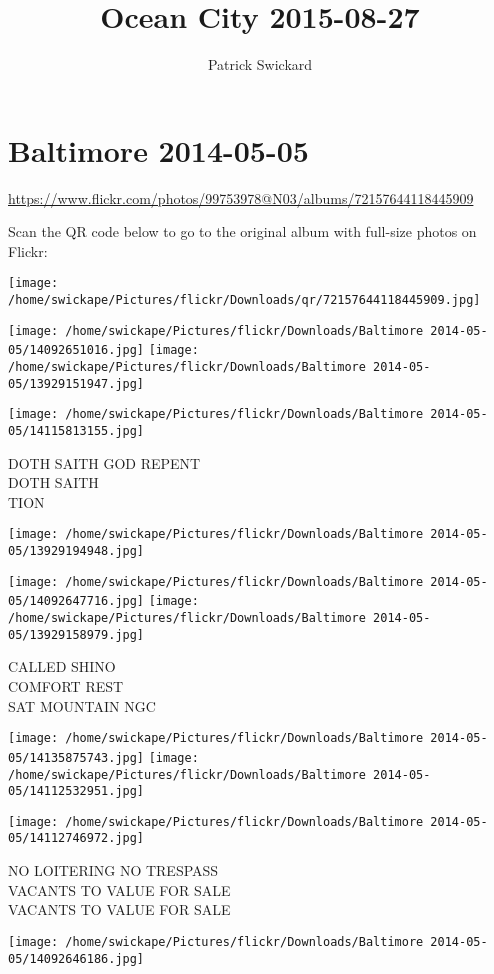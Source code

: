\documentclass[10pt,letterpaper]{article}
\title{Ocean City 2015-08-27}
\author{Patrick Swickard}
\date{}
\begin{document}
\section*{Baltimore 2014-05-05}

\url{https://www.flickr.com/photos/99753978@N03/albums/72157644118445909}

Scan the QR code below to go to the original album with full-size photos on Flickr:

\texttt{[image: /home/swickape/Pictures/flickr/Downloads/qr/72157644118445909.jpg]}
\pagebreak

\texttt{[image: /home/swickape/Pictures/flickr/Downloads/Baltimore 2014-05-05/14092651016.jpg]}
\texttt{[image: /home/swickape/Pictures/flickr/Downloads/Baltimore 2014-05-05/13929151947.jpg]}

\texttt{[image: /home/swickape/Pictures/flickr/Downloads/Baltimore 2014-05-05/14115813155.jpg]}

DOTH SAITH GOD REPENT\\
DOTH SAITH\\
TION
\pagebreak

\texttt{[image: /home/swickape/Pictures/flickr/Downloads/Baltimore 2014-05-05/13929194948.jpg]}

\vspace{0.25in}
\texttt{[image: /home/swickape/Pictures/flickr/Downloads/Baltimore 2014-05-05/14092647716.jpg]}
\texttt{[image: /home/swickape/Pictures/flickr/Downloads/Baltimore 2014-05-05/13929158979.jpg]}

CALLED SHINO\\
COMFORT REST\\
SAT MOUNTAIN NGC
\pagebreak

\texttt{[image: /home/swickape/Pictures/flickr/Downloads/Baltimore 2014-05-05/14135875743.jpg]}
\texttt{[image: /home/swickape/Pictures/flickr/Downloads/Baltimore 2014-05-05/14112532951.jpg]}

\texttt{[image: /home/swickape/Pictures/flickr/Downloads/Baltimore 2014-05-05/14112746972.jpg]}

NO LOITERING NO TRESPASS\\
VACANTS TO VALUE FOR SALE\\
VACANTS TO VALUE FOR SALE
\pagebreak

\texttt{[image: /home/swickape/Pictures/flickr/Downloads/Baltimore 2014-05-05/14092646186.jpg]}
\end{document}
